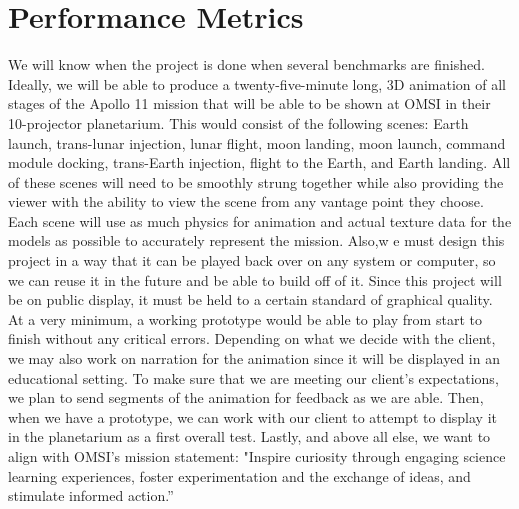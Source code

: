 \documentclass[onecolumn, draftclsnofoot,10pt, compsoc]{IEEEtran}
\begin{document}
\section{Performance Metrics}
We will know when the project is done when several benchmarks are finished. Ideally, we will be able to produce a twenty-five-minute long, 3D animation of all stages of the Apollo 11 mission that will be able to be shown at OMSI in their 10-projector planetarium. This would consist of the following scenes: Earth launch, trans-lunar injection, lunar flight, moon landing, moon launch, command module docking, trans-Earth injection, flight to the Earth, and Earth landing. All of these scenes will need to be smoothly strung together while also providing the viewer with the ability to view the scene from any vantage point they choose. Each scene will use as much physics for animation and actual texture data for the models as possible to accurately represent the mission. Also,w e must design this project in a way that it can be played back over on any system or computer, so we can reuse it in the future and be able to build off of it.
\newline
\newline
Since this project will be on public display, it must be held to a certain standard of graphical quality. At a very minimum, a working prototype would be able to play from start to finish without any critical errors. Depending on what we decide with the client, we may also work on narration for the animation since it will be displayed in an educational setting. To make sure that we are meeting our client's expectations, we plan to send segments of the animation for feedback as we are able. Then, when we have a prototype, we can work with our client to attempt to display it in the planetarium as a first overall test. Lastly, and above all else, we want to align with OMSI’s mission statement: "Inspire curiosity through engaging science learning experiences, foster experimentation and the exchange of ideas, and stimulate informed action.” 
\end{document}
